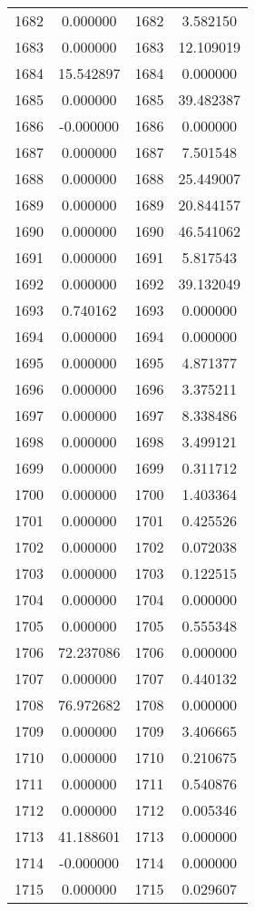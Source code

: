 \documentclass[12pt]{article}
\begin{document}
\begin{longtable}{@{}cccc@{}}
1682 & 0.000000 & 1682 & 3.582150 \\
1683 & 0.000000 & 1683 & 12.109019 \\
1684 & 15.542897 & 1684 & 0.000000 \\
1685 & 0.000000 & 1685 & 39.482387 \\
1686 & -0.000000 & 1686 & 0.000000 \\
1687 & 0.000000 & 1687 & 7.501548 \\
1688 & 0.000000 & 1688 & 25.449007 \\
1689 & 0.000000 & 1689 & 20.844157 \\
1690 & 0.000000 & 1690 & 46.541062 \\
1691 & 0.000000 & 1691 & 5.817543 \\
1692 & 0.000000 & 1692 & 39.132049 \\
1693 & 0.740162 & 1693 & 0.000000 \\
1694 & 0.000000 & 1694 & 0.000000 \\
1695 & 0.000000 & 1695 & 4.871377 \\
1696 & 0.000000 & 1696 & 3.375211 \\
1697 & 0.000000 & 1697 & 8.338486 \\
1698 & 0.000000 & 1698 & 3.499121 \\
1699 & 0.000000 & 1699 & 0.311712 \\
1700 & 0.000000 & 1700 & 1.403364 \\
1701 & 0.000000 & 1701 & 0.425526 \\
1702 & 0.000000 & 1702 & 0.072038 \\
1703 & 0.000000 & 1703 & 0.122515 \\
1704 & 0.000000 & 1704 & 0.000000 \\
1705 & 0.000000 & 1705 & 0.555348 \\
1706 & 72.237086 & 1706 & 0.000000 \\
1707 & 0.000000 & 1707 & 0.440132 \\
1708 & 76.972682 & 1708 & 0.000000 \\
1709 & 0.000000 & 1709 & 3.406665 \\
1710 & 0.000000 & 1710 & 0.210675 \\
1711 & 0.000000 & 1711 & 0.540876 \\
1712 & 0.000000 & 1712 & 0.005346 \\
1713 & 41.188601 & 1713 & 0.000000 \\
1714 & -0.000000 & 1714 & 0.000000 \\
1715 & 0.000000 & 1715 & 0.029607 \\

\end{longtable}
\end{document}
